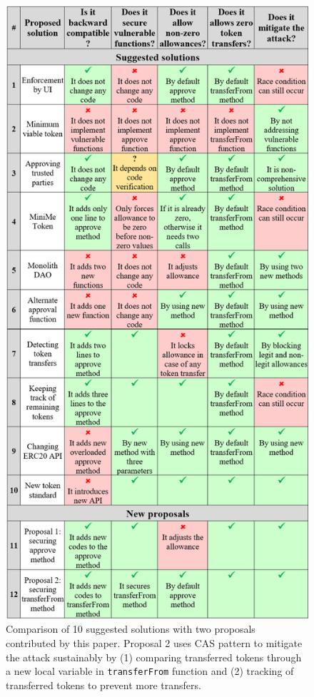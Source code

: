 \begin{figure}[t!]
	\centering
	\includegraphics[width=1.0\linewidth]{figures/multiple_withdrawal_04.png}
	\caption{Comparison of 10 suggested solutions with two proposals contributed by this paper. Proposal 2 uses CAS pattern to mitigate the attack sustainably by (1) comparing transferred tokens through a new local variable in \texttt{transferFrom} function and (2) tracking of transferred tokens to prevent more transfers.\label{tab:comp}}
\end{figure}
